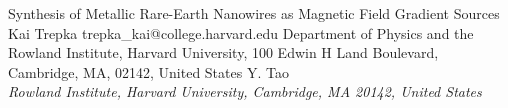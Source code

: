 \begin{conf-abstract}[]
{Synthesis of Metallic Rare-Earth Nanowires as Magnetic Field Gradient Sources}
{\color{blue} Kai Trepka}
{trepka\_kai@college.harvard.edu}
{Department of Physics and the Rowland Institute, Harvard University, 100 Edwin H Land Boulevard, Cambridge, MA, 02142, United States}
{{\color{blue}Y. Tao}\\ \textit{Rowland Institute, Harvard University, Cambridge, MA 20142, United States}\\ 
\decofourleft \decofourright}





\printbibliography[heading=none]

\end{conf-abstract}

